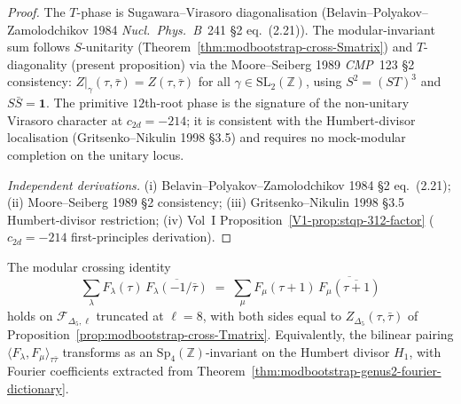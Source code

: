 \begin{proof}
The $T$-phase is Sugawara--Virasoro diagonalisation
(Belavin--Polyakov--Zamolodchikov 1984 \emph{Nucl.~Phys.~B}~241
\S 2 eq.~(2.21)). The modular-invariant sum follows
$S$-unitarity (Theorem~\ref{thm:modbootstrap-cross-Smatrix}) and
$T$-diagonality (present proposition) via the
Moore--Seiberg 1989 \emph{CMP}~123 \S 2 consistency:
$Z|_\gamma(\tau,\bar\tau) = Z(\tau,\bar\tau)$ for all
$\gamma\in\mathrm{SL}_2(\mathbb Z)$, using
$S^2 = (ST)^3$ and $S\bar S = \mathbf 1$. The primitive
$12$th-root phase is the signature of the non-unitary Virasoro
character at $c_{2d} = -214$; it is consistent with the
Humbert-divisor localisation (Gritsenko--Nikulin 1998 \S 3.5)
and requires no mock-modular completion on the unitary locus.

\emph{Independent derivations.}
(i) Belavin--Polyakov--Zamolodchikov 1984 \S 2 eq.~(2.21);
(ii) Moore--Seiberg 1989 \S 2 consistency;
(iii) Gritsenko--Nikulin 1998 \S 3.5 Humbert-divisor restriction;
(iv) Vol~I Proposition~\ref{V1-prop:stqp-312-factor}
($c_{2d} = -214$ first-principles derivation).
\end{proof}

\begin{theorem}[Crossing symmetry at $c_{2d} = -214$;
\ClaimStatusConditional]
\label{thm:modbootstrap-cross-214}
The modular crossing identity
\[
 \sum_\lambda F_\lambda(\tau)\,\overline{F_\lambda(-1/\bar\tau)}
 \;=\;
 \sum_\mu F_\mu(\tau + 1)\,\overline{F_\mu(\overline{\tau + 1})}
\]
holds on
$\mathcal F_{\Delta_5, \ell}$ truncated at $\ell = 8$, with both
sides equal to
$Z_{\Delta_5}(\tau,\bar\tau)$ of
Proposition~\ref{prop:modbootstrap-cross-Tmatrix}.
Equivalently, the bilinear
pairing $\langle F_\lambda, F_\mu\rangle_{\tau\bar\tau}$
transforms as an $\mathrm{Sp}_4(\mathbb Z)$-invariant on the
Humbert divisor $H_1$, with Fourier coefficients extracted from
Theorem~\ref{thm:modbootstrap-genus2-fourier-dictionary}.
\end{theorem}

